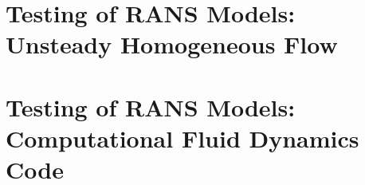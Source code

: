 \documentclass[11pt]{article}
\begin{document}
\subsection{}

\subsection{}

\subsection{}

\section{Testing of RANS Models: Unsteady Homogeneous Flow}

\subsection{}

\subsection{}

\subsection{}

\subsection{}

\subsection{}

\subsection{}

\subsection{}

\section{Testing of RANS Models: Computational Fluid Dynamics Code}

\subsection{}

\end{document}
